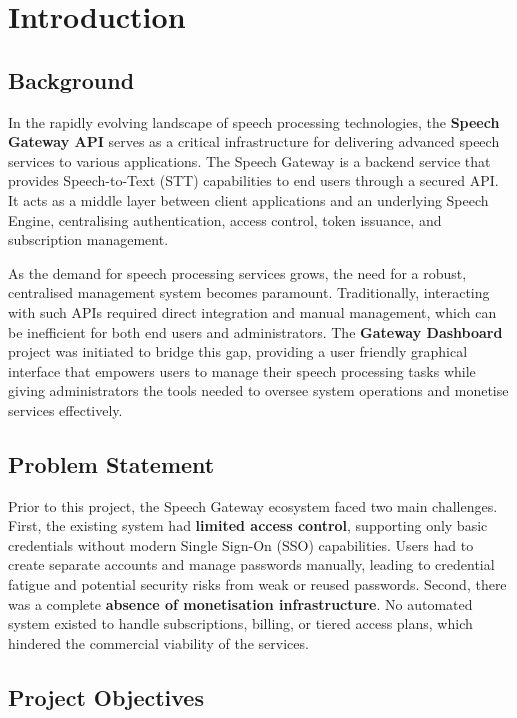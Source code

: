 \chapter{Introduction}
\label{chap:introduction}

\section{Background}

In the rapidly evolving landscape of speech processing technologies, the \textbf{Speech Gateway API} serves as a critical infrastructure for delivering advanced speech services to various applications. The Speech Gateway is a backend service that provides Speech-to-Text (STT) capabilities to end users through a secured API. It acts as a middle layer between client applications and an underlying Speech Engine, centralising authentication, access control, token issuance, and subscription management.

As the demand for speech processing services grows, the need for a robust, centralised management system becomes paramount. Traditionally, interacting with such APIs required direct integration and manual management, which can be inefficient for both end users and administrators. The \textbf{Gateway Dashboard} project was initiated to bridge this gap, providing a user friendly graphical interface that empowers users to manage their speech processing tasks while giving administrators the tools needed to oversee system operations and monetise services effectively.

\section{Problem Statement}

Prior to this project, the Speech Gateway ecosystem faced two main challenges. First, the existing system had \textbf{limited access control}, supporting only basic credentials without modern Single Sign-On (SSO) capabilities. Users had to create separate accounts and manage passwords manually, leading to credential fatigue and potential security risks from weak or reused passwords. Second, there was a complete \textbf{absence of monetisation infrastructure}. No automated system existed to handle subscriptions, billing, or tiered access plans, which hindered the commercial viability of the services.

\section{Project Objectives}


